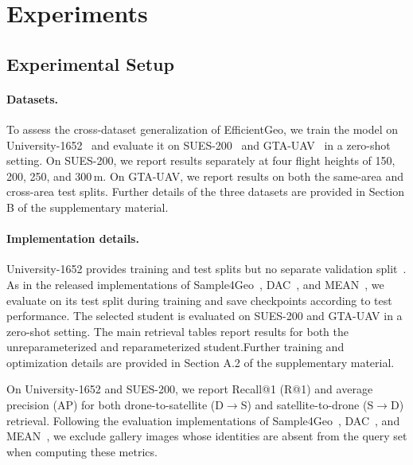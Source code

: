 \section{Experiments}
\label{sec:experiments}



\subsection{Experimental Setup}
\label{sec:experimental_setup}

\paragraph{Datasets.}
To assess the cross-dataset generalization of EfficientGeo,
we train the model on University-1652~\cite{zheng2020university}
and evaluate it on SUES-200~\cite{zhu2023sues} and
GTA-UAV~\cite{ji2025game4loc} in a zero-shot setting. On
SUES-200, we report results separately at four flight
heights of 150, 200, 250, and 300\,m. On GTA-UAV, we
report results on both the same-area and cross-area test
splits. Further details of the three datasets are provided
in Section B of the supplementary material.



\paragraph{Implementation details.}
University-1652 provides training and test splits but no
separate validation split~\cite{zheng2020university}.
As in the released implementations of
Sample4Geo~\cite{deuser2023sample4geo},
DAC~\cite{xia2024dac}, and
MEAN~\cite{chen2025mean}, we evaluate on its test split
during training and save checkpoints according to test
performance. The selected student is evaluated on SUES-200
and GTA-UAV in a zero-shot setting. The main retrieval tables
report results for both the unreparameterized and reparameterized student.Further training and optimization details are provided in Section A.2 of the supplementary material.

On University-1652 and SUES-200, we report Recall@1
(R@1) and average precision (AP) for both
drone-to-satellite (D$\rightarrow$S) and
satellite-to-drone (S$\rightarrow$D) retrieval.
Following the evaluation implementations of
Sample4Geo~\cite{deuser2023sample4geo},
DAC~\cite{xia2024dac}, and
MEAN~\cite{chen2025mean}, we exclude gallery images
whose identities are absent from the query set when
computing these metrics.

